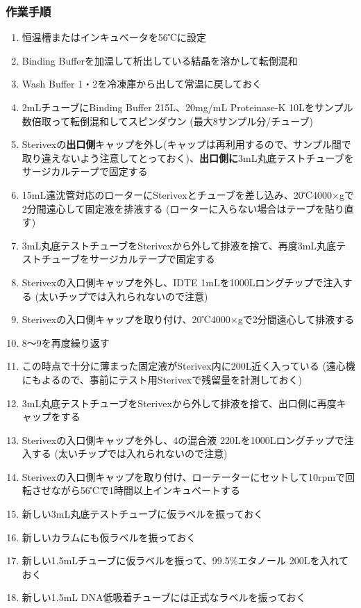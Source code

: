 \documentclass[titlepage,10pt,a4paper,uplatex]{jsbook}
\renewcommand{\textbf}[1]{{\bfseries\sffamily#1}}
\begin{document}
\subsubsection{作業手順}
\begin{enumerate}
\item 恒温槽またはインキュベータを56℃に設定
\item Binding Bufferを加温して析出している結晶を溶かして転倒混和
\item Wash Buffer 1・2を冷凍庫から出して常温に戻しておく
\item 2mLチューブにBinding Buffer 215{\textmu}L、20mg/mL Proteinase-K 10{\textmu}Lをサンプル数倍取って転倒混和してスピンダウン (最大8サンプル分/チューブ)
\item Sterivexの\textbf{出口側}キャップを外し(キャップは再利用するので、サンプル間で取り違えないよう注意してとっておく)、\textbf{出口側に}3mL丸底テストチューブをサージカルテープで固定する
\item 15mL遠沈管対応のローターにSterivexとチューブを差し込み、20℃4000×gで2分間遠心して固定液を排液する (ローターに入らない場合はテープを貼り直す)
\item 3mL丸底テストチューブをSterivexから外して排液を捨て、再度3mL丸底テストチューブをサージカルテープで固定する
\item Sterivexの入口側キャップを外し、IDTE 1mLを1000{\textmu}Lロングチップで注入する (太いチップでは入れられないので注意)
\item Sterivexの入口側キャップを取り付け、20℃4000×gで2分間遠心して排液する
\item 8～9を再度繰り返す
\item この時点で十分に薄まった固定液がSterivex内に200{\textmu}L近く入っている (遠心機にもよるので、事前にテスト用Sterivexで残留量を計測しておく)
\item 3mL丸底テストチューブをSterivexから外して排液を捨て、出口側に再度キャップをする
\item Sterivexの入口側キャップを外し、4の混合液 220{\textmu}Lを1000{\textmu}Lロングチップで注入する (太いチップでは入れられないので注意)
\item Sterivexの入口側キャップを取り付け、ローテーターにセットして10rpmで回転させながら56℃で1時間以上インキュベートする
\item 新しい3mL丸底テストチューブに仮ラベルを振っておく
\item 新しいカラムにも仮ラベルを振っておく
\item 新しい1.5mLチューブに仮ラベルを振って、99.5\%エタノール 200{\textmu}Lを入れておく
\item 新しい1.5mL DNA低吸着チューブには正式なラベルを振っておく

\end{enumerate}
\end{document}
